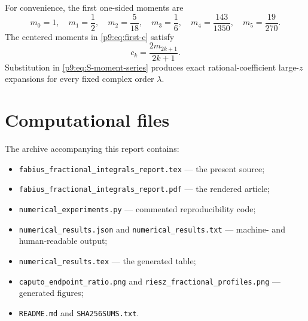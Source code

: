 \documentclass[11pt,oneside]{article}
\theoremstyle{definition}
\theoremstyle{remark}
\newcommand{\1}{\mathbf 1}
\begin{document}
For convenience, the first one-sided moments are
\begin{equation}
 m_0=1,
 \quad m_1=\frac12,
 \quad m_2=\frac5{18},
 \quad m_3=\frac16,
 \quad m_4=\frac{143}{1350},
 \quad m_5=\frac{19}{270}.
 \label{p9:eq:low-moments-appendix}
\end{equation}
The centered moments in \cref{p9:eq:first-c} satisfy
\begin{equation}
 c_k=\frac{2m_{2k+1}}{2k+1}.
 \label{p9:eq:c-m-relation}
\end{equation}
Substitution in \cref{p9:eq:S-moment-series} produces exact rational-coefficient
large-$z$ expansions for every fixed complex order $\lambda$.

\section{Computational files}

The archive accompanying this report contains:
\begin{itemize}
\item \texttt{fabius\_fractional\_integrals\_report.tex} --- the present source;
\item \texttt{fabius\_fractional\_integrals\_report.pdf} --- the rendered article;
\item \texttt{numerical\_experiments.py} --- commented reproducibility code;
\item \texttt{numerical\_results.json} and
      \texttt{numerical\_results.txt} --- machine- and human-readable output;
\item \texttt{numerical\_results.tex} --- the generated table;
\item \texttt{caputo\_endpoint\_ratio.png} and
      \texttt{riesz\_fractional\_profiles.png} --- generated figures;
\item \texttt{README.md} and \texttt{SHA256SUMS.txt}.
\end{itemize}
\end{document}
